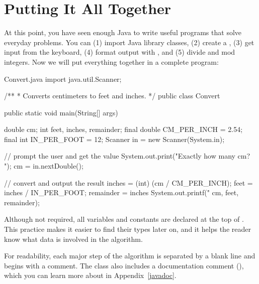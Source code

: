 {{%

\section{Putting It All Together}

At this point, you have seen enough Java to write useful programs that solve everyday problems.
You can (1) import Java library classes, (2) create a , (3) get input from the keyboard, (4) format output with , and (5) divide and mod integers.
Now we will put everything together in a complete program:



\begin{trinket}{Convert.java}
import java.util.Scanner;

/**
 * Converts centimeters to feet and inches.
 */
public class Convert {

    public static void main(String[] args) {
        double cm;
        int feet, inches, remainder;
        final double CM_PER_INCH = 2.54;
        final int IN_PER_FOOT = 12;
        Scanner in = new Scanner(System.in);

        // prompt the user and get the value
        System.out.print("Exactly how many cm? ");
        cm = in.nextDouble();

        // convert and output the result
        inches = (int) (cm / CM_PER_INCH);
        feet = inches / IN_PER_FOOT;
        remainder = inches %
        System.out.printf("%
                          cm, feet, remainder);
    }
}
\end{trinket}

Although not required, all variables and constants are declared at the top of .
This practice makes it easier to find their types later on, and it helps the reader know what data is involved in the algorithm.


For readability, each major step of the algorithm is separated by a blank line and begins with a comment.
The class also includes a documentation comment (\java{/**}), which you can learn more about in Appendix~\ref{javadoc}.

}}
